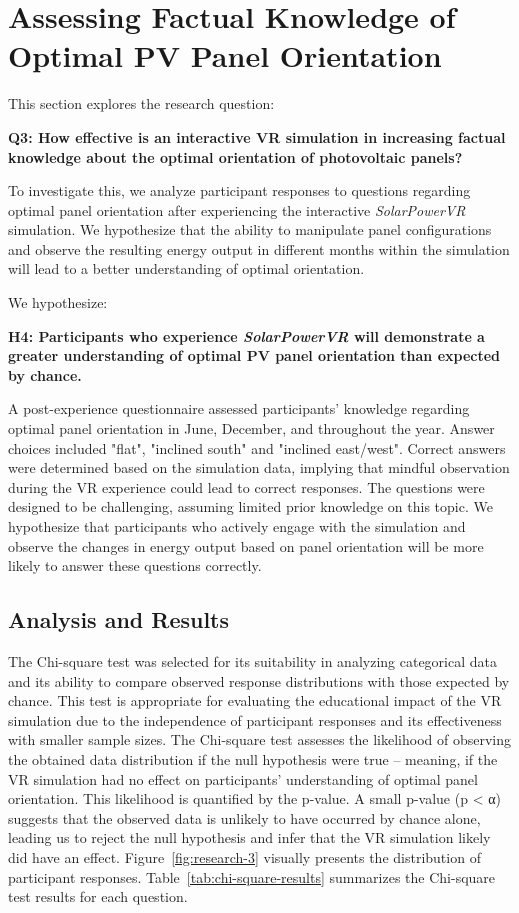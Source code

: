 \documentclass[draft, final]{vutinfth} %
\begin{document}
\section{Assessing Factual Knowledge of Optimal PV Panel Orientation}

This section explores the research question:

\textbf{Q3: How effective is an interactive VR simulation in increasing factual knowledge about the optimal orientation of photovoltaic panels?}

To investigate this, we analyze participant responses to questions regarding optimal panel orientation after experiencing the interactive \textit{SolarPowerVR} simulation.  We hypothesize that the ability to manipulate panel configurations and observe the resulting energy output in different months within the simulation will lead to a better understanding of optimal orientation.

We hypothesize:

\textbf{H4: Participants who experience \textit{SolarPowerVR} will demonstrate a greater understanding of optimal PV panel orientation than expected by chance.}

A post-experience questionnaire assessed participants' knowledge regarding optimal panel orientation in June, December, and throughout the year.  Answer choices included "flat", "inclined south" and "inclined east/west". Correct answers were determined based on the simulation data, implying that mindful observation during the VR experience could lead to correct responses. The questions were designed to be challenging, assuming limited prior knowledge on this topic.  We hypothesize that participants who actively engage with the simulation and observe the changes in energy output based on panel orientation will be more likely to answer these questions correctly.

\subsection{Analysis and Results}

The Chi-square test was selected for its suitability in analyzing categorical data and its ability to compare observed response distributions with those expected by chance. This test is appropriate for evaluating the educational impact of the VR simulation due to the independence of participant responses and its effectiveness with smaller sample sizes. The Chi-square test assesses the likelihood of observing the obtained data distribution if the null hypothesis were true – meaning, if the VR simulation had no effect on participants' understanding of optimal panel orientation. This likelihood is quantified by the p-value. A small p-value (p < α) suggests that the observed data is unlikely to have occurred by chance alone, leading us to reject the null hypothesis and infer that the VR simulation likely did have an effect. Figure~\ref{fig:research-3} visually presents the distribution of participant responses. Table~\ref{tab:chi-square-results} summarizes the Chi-square test results for each question.
\end{document}
